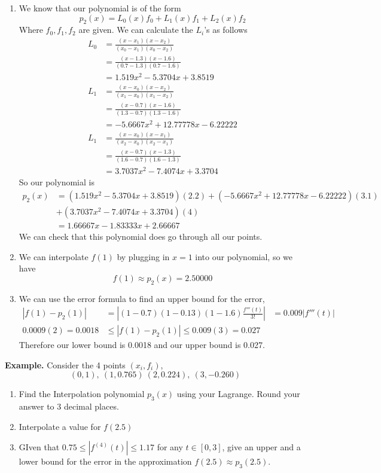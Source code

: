 \documentclass[openany]{report}
\begin{document}
\begin{enumerate}[label=(\roman*)]
    \item We know that our polynomial is of the form
    \[p_2(x) = L_0(x) f_0 + L_1(x)f_1 + L_2(x)f_2\]
    Where $f_0,f_1,f_2$ are given. We can calculate the $L_i$'s as follows
    \begin{align*}
        L_0 &= \frac{(x - x_1)(x-x_2)}{(x_0 - x_1)(x_0-x_2)}\\
        &= \frac{(x-1.3)(x-1.6)}{(0.7 - 1.3)(0.7-1.6)}\\
        &= 1.519x^2 - 5.3704x + 3.8519\\
        L_1 &= \frac{(x - x_0)(x-x_2)}{(x_1 - x_0)(x_1-x_2)}\\
        &= \frac{(x-0.7)(x-1.6)}{(1.3-0.7)(1.3-1.6)}\\
        &= -5.6667x^2 + 12.77778x - 6.22222\\
        L_1 &= \frac{(x - x_0)(x-x_1)}{(x_2 - x_0)(x_2-x_1)}\\
        &= \frac{(x-0.7)(x-1.3)}{(1.6-0.7)(1.6-1.3)}\\
        &= 3.7037x^2 - 7.4074x + 3.3704
    \end{align*}
    So our polynomial is
    \begin{align*}
        p_2(x) &= (1.519x^2 - 5.3704x + 3.8519)(2.2) + (-5.6667x^2 + 12.77778x - 6.22222)(3.1) \\
        &+ (3.7037x^2 - 7.4074x + 3.3704)(4)\\
        &= 1.66667x - 1.83333x + 2.66667
    \end{align*}
    We can check that this polynomial does go through all our points.
    \item We can interpolate $f(1)$ by plugging in $x = 1$ into our polynomial, so we have
    \[f(1) \approx p_2(x) = 2.50000\]
    \item We can use the error formula to find an upper bound for the error,
    \begin{align*}
        |f(1) - p_2(1)| &= \left|(1 - 0.7)(1-0.13)(1-1.6)\frac{f'''(t)}{3!}\right|
        &= 0.009 |f'''(t)|\\
        0.0009(2) = 0.0018 &\leq |f(1) - p_2(1)| \leq 0.009(3) = 0.027
    \end{align*}
    Therefore our lower bound is 0.0018 and our upper bound is 0.027.
\end{enumerate}
\textbf{Example.} Consider the 4 points $(x_i,f_i)$, 
\[(0,1), \ (1,0.765) \ (2,0.224), \ (3, -0.260) \]
\begin{enumerate}[label=(\roman*)]
    \item Find the Interpolation polynomial $p_3(x)$ using your Lagrange. Round your answer to 3 decimal places.
    \item Interpolate a value for $f(2.5)$
    \item GIven that $0.75 \leq |f^{(4)}(t)| \leq 1.17$ for any $t \in [0,3]$, give an upper and a lower bound for the error in the approximation $f(2.5) \approx p_3(2.5)$.
\end{enumerate}
\end{document}
